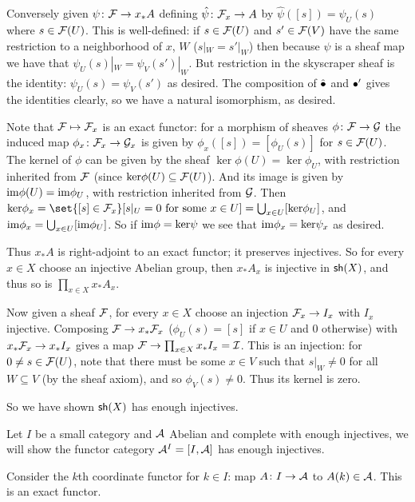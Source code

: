     Conversely given $\psi\colon{{\cal F}}\to x_*A$ defining $\hat\psi\colon{{\cal F}}_x\to A$ by $\hat\psi([s])=\psi_U(s)$ where $s\in{{\cal F}}(U)$.
    This is well-defined: if $s\in{{\cal F}}(U)$ and $s'\in{{\cal F}}(V)$ have the same restriction to a neighborhood of $x$, $W$ ($s|_W=s'|_W$) then because $\psi$ is a sheaf map we have that $\psi_U(s)|_W=\psi_V(s')|_W$.
    But restriction in the skyscraper sheaf is the identity: $\psi_U(s)=\psi_V(s')$ as desired.
    The composition of $\hat{\bullet}$ and $\bullet'$ gives the identities clearly, so we have a natural isomorphism, as desired.

    Note that ${{\cal F}}\mapsto{{\cal F}}_x$ is an exact functor: for a morphism of sheaves $\phi\colon{{\cal F}}\to{\cal G}$ the induced map $\phi_x\colon{{\cal F}}_x\to{\cal G}_x$ is given by $\phi_x([s])=[\phi_U(s)]$ for $s\in{{\cal F}}(U)$.
    The kernel of $\phi$ can be given by the sheaf $\ker\phi(U)=\ker\phi_U$, with restriction inherited from ${{\cal F}}$ (since ${\rm ker}\phi(U)\subseteq{{\cal F}}(U)$).
    And its image is given by ${\rm im}\phi(U)={\rm im}\phi_U$, with restriction inherited from ${\cal G}$.
    Then $\ker\phi_x=\set{[s]\in\F_x}[\hbox{$s|_U=0$ for some $x\in U$}]=\bigcup_{x\in U}[\ker\phi_U]$, and ${\rm im}\phi_x=\bigcup_{x\in U}[{\rm im}\phi_U]$.
    So if ${\rm im}\phi={\rm ker}\psi$ we see that ${\rm im}\phi_x={\rm ker}\psi_x$ as desired.

    Thus $x_*A$ is right-adjoint to an exact functor; it preserves injectives.
    So for every $x\in X$ choose an injective Abelian group, then $x_*A_x$ is injective in ${\sf sh}(X)$, and thus so is $\prod_{x\in X}x_*A_x$.

    Now given a sheaf ${{\cal F}}$, for every $x\in X$ choose an injection ${{\cal F}}_x\to I_x$ with $I_x$ injective.
    Composing ${{\cal F}}\to x_*{{\cal F}}_x$ ($\phi_U(s)=[s]$ if $x\in U$ and $0$ otherwise) with $x_*{{\cal F}}_x\to x_*I_x$ gives a map ${{\cal F}}\to\prod_{x\in X}x_*I_x={\cal I}$.
    This is an injection: for $0\neq s\in{{\cal F}}(U)$, note that there must be some $x\in V$ such that $s|_W\neq0$ for all $W\subseteq V$ (by the sheaf axiom), and so $\phi_V(s)\neq0$.
    Thus its kernel is zero.

    So we have shown ${\sf sh}(X)$ has enough injectives.

\eexam

\bexam

    Let $I$ be a small category and ${{\cal A}}$ Abelian and complete with enough injectives, we will show the functor category ${{\cal A}}^I=[I,{{\cal A}}]$ has enough injectives.

    Consider the {\emphcolor $k$th coordinate functor} for $k\in I$: map $A\colon I\to{{\cal A}}$ to $A(k)\in{{\cal A}}$.
    This is an exact functor.

